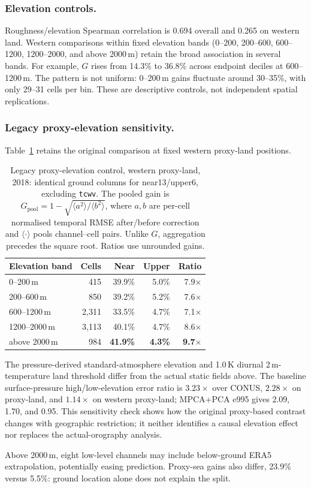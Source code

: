 \subsubsection{Elevation controls.}
Roughness/elevation Spearman correlation is 0.694 overall and 0.265 on western
land. Western comparisons within fixed elevation bands (0--200, 200--600,
600--1200, 1200--2000, and above 2000\,m) retain the broad association in several
bands. For example, $G$ rises from 14.3\% to 36.8\% across endpoint deciles
at 600--1200\,m. The pattern is not uniform: 0--200\,m gains fluctuate around
30--35\%, with only 29--31 cells per bin. These are descriptive controls, not
independent spatial replications.

\subsubsection{Legacy proxy-elevation sensitivity.}
Table~\ref{tab:twoheights} retains the original comparison at fixed western
proxy-land positions.

\begin{table}[!htb]
\centering
\caption{Legacy proxy-elevation control, western proxy-land, 2018: identical
ground columns for near13/upper6, excluding \texttt{tcwv}. The pooled gain is
$G_{\mathrm{pool}}=1-\sqrt{\langle a^2\rangle/\langle b^2\rangle}$, where
$a,b$ are per-cell normalised temporal RMSE after/before correction and
$\langle\cdot\rangle$ pools channel--cell pairs. Unlike $G$, aggregation precedes
the square root. Ratios use unrounded gains.}
\label{tab:twoheights}
\begin{tabular}{lrrrr}
\toprule
Elevation band & Cells & Near & Upper & Ratio \\
\midrule
0--200\,m & 415 & 39.9\% & 5.0\% & 7.9$\times$ \\
200--600\,m & 850 & 39.2\% & 5.2\% & 7.6$\times$ \\
600--1200\,m & 2{,}311 & 33.5\% & 4.7\% & 7.1$\times$ \\
1200--2000\,m & 3{,}113 & 40.1\% & 4.7\% & 8.6$\times$ \\
above 2000\,m & 984 & \textbf{41.9\%} & \textbf{4.3\%} & \textbf{9.7$\times$} \\
\bottomrule
\end{tabular}
\end{table}

The pressure-derived standard-atmosphere elevation and 1.0\,K diurnal
2\,m-temperature land threshold differ from the actual static fields above.
The baseline surface-pressure high/low-elevation error ratio is $3.23\times$
over CONUS, $2.28\times$ on proxy-land, and $1.14\times$ on western proxy-land;
MPCA+PCA e995 gives 2.09, 1.70, and 0.95. This sensitivity check shows how the original proxy-based contrast changes
with geographic restriction; it neither identifies a causal elevation effect
nor replaces the actual-orography analysis.

Above 2000\,m, eight low-level channels may include below-ground ERA5
extrapolation, potentially easing prediction. Proxy-sea gains also differ,
23.9\% versus 5.5\%: ground location alone does not explain the split.
